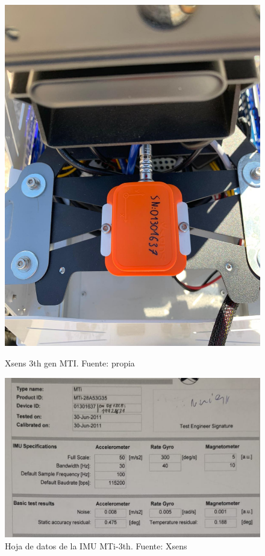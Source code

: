 \begin{figure}[!htb]
  \centering
  \begin{minipage}[b]{0.35\textwidth}
    \centering
    \includegraphics[width=\textwidth]{images/xsens.jpeg}
    \caption{Xsens 3th gen MTI. Fuente: propia}
    \label{fig:xsens_imu}
  \end{minipage}
  \hfill
  \begin{minipage}[b]{0.5\textwidth}
    \centering
    \includegraphics[width=\textwidth]{images/datasheet_mti.png}
    \caption{Hoja de datos de la IMU MTi-3th. Fuente: Xsens}
    \label{fig:xsens_datasheet}
  \end{minipage}
\end{figure}
